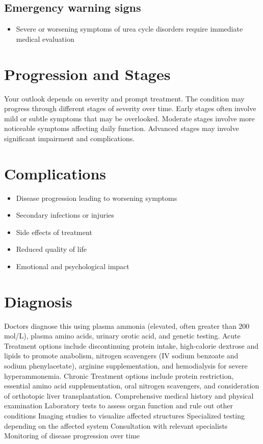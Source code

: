 \subsection{Emergency warning signs}
\begin{itemize}[noitemsep]
  \item Severe or worsening symptoms of urea cycle disorders require immediate medical evaluation
\end{itemize}
\section{Progression and Stages}
Your outlook depends on severity and prompt treatment. The condition may progress through different stages of severity over time. Early stages often involve mild or subtle symptoms that may be overlooked. Moderate stages involve more noticeable symptoms affecting daily function. Advanced stages may involve significant impairment and complications.
\section{Complications}
\begin{itemize}[noitemsep]
  \item Disease progression leading to worsening symptoms
  \item Secondary infections or injuries
  \item Side effects of treatment
  \item Reduced quality of life
  \item Emotional and psychological impact
\end{itemize}
\section{Diagnosis}
Doctors diagnose this using plasma ammonia (elevated, often greater than 200 \textmu mol/L), plasma amino acids, urinary orotic acid, and genetic testing. Acute Treatment options include discontinuing protein intake, high-calorie dextrose and lipids to promote anabolism, nitrogen scavengers (IV sodium benzoate and sodium phenylacetate), arginine supplementation, and hemodialysis for severe hyperammonemia. Chronic Treatment options include protein restriction, essential amino acid supplementation, oral nitrogen scavengers, and consideration of orthotopic liver transplantation. Comprehensive medical history and physical examination Laboratory tests to assess organ function and rule out other conditions Imaging studies to visualize affected structures Specialized testing depending on the affected system Consultation with relevant specialists Monitoring of disease progression over time

